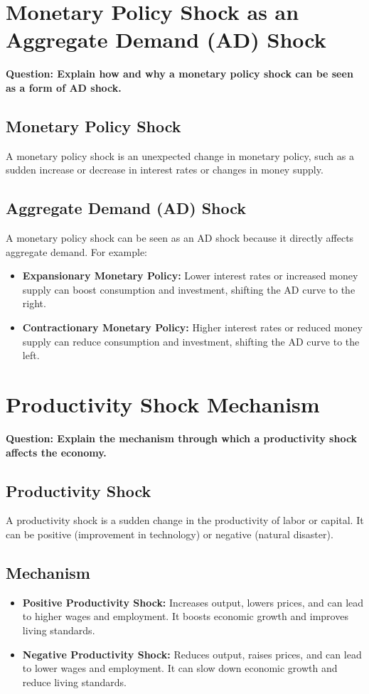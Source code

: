 \documentclass{article}
\begin{document}
\section{Monetary Policy Shock as an Aggregate Demand (AD) Shock}
\textbf{Question: Explain how and why a monetary policy shock can be seen as a form of AD shock.}

\subsection{Monetary Policy Shock}
A monetary policy shock is an unexpected change in monetary policy, such as a sudden increase or decrease in interest rates or changes in money supply.

\subsection{Aggregate Demand (AD) Shock}
A monetary policy shock can be seen as an AD shock because it directly affects aggregate demand. For example:
\begin{itemize}
    \item \textbf{Expansionary Monetary Policy:} Lower interest rates or increased money supply can boost consumption and investment, shifting the AD curve to the right.
    \item \textbf{Contractionary Monetary Policy:} Higher interest rates or reduced money supply can reduce consumption and investment, shifting the AD curve to the left.
\end{itemize}

\section{Productivity Shock Mechanism}
\textbf{Question: Explain the mechanism through which a productivity shock affects the economy.}

\subsection{Productivity Shock}
A productivity shock is a sudden change in the productivity of labor or capital. It can be positive (improvement in technology) or negative (natural disaster).

\subsection{Mechanism}
\begin{itemize}
    \item \textbf{Positive Productivity Shock:} Increases output, lowers prices, and can lead to higher wages and employment. It boosts economic growth and improves living standards.
    \item \textbf{Negative Productivity Shock:} Reduces output, raises prices, and can lead to lower wages and employment. It can slow down economic growth and reduce living standards.
\end{itemize}
\end{document}
